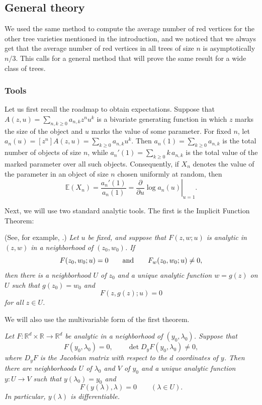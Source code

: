\documentclass[11pt, onesided]{amsart}
\theoremstyle{remark}
\begin{document}
\subsection{General theory}
\label{sec:general}

We used the same method to compute the average number of red vertices for the other tree varieties mentioned in the introduction, and we noticed that we always get that the average number of red vertices in all trees of size $n$ is asymptotically $n/3$. This calls for a general method that will prove the same result for a wide class of trees.

\subsubsection{Tools}\label{subsubsec:tools}

Let us first recall the roadmap to obtain expectations.
Suppose that
$
A(z,u)=\sum_{n,k\geq 0} a_{n,k}z^n u^k
$
is a bivariate generating function in which \(z\) marks the size of the object and \(u\) marks the value of some parameter. For fixed \(n\), let
$
a_n(u)=[z^n]A(z,u)=\sum_{k\geq 0} a_{n,k}u^k.
$
Then
$
a_n(1)=\sum_{k\geq 0}a_{n,k}
$
is the total number of objects of size \(n\), while
$
a_n'(1)=\sum_{k\geq 0}k\,a_{n,k}
$
is the total value of the marked parameter over all such objects. Consequently, if \(X_n\) denotes the value of the parameter in an object of size \(n\) chosen uniformly at random, then
\begin{equation}
\label{eq:expectations}
\mathbb E(X_n)
=
\frac{a_n'(1)}{a_n(1)}
=
\left.
\frac{\partial}{\partial u}
\log a_n(u)
\right|_{u=1}.
\end{equation}


Next, we will use two standard analytic tools. The first is the Implicit Function Theorem:

\medskip
{}
(See, for example, \cite[Appendix B.5]{FlajoletSedgewick}.)
\emph{
Let $u$ be fixed, and suppose that $F(z,w;u)$ is analytic in $(z,w)$ in a neighborhood of $(z_0,w_0)$. If
\[
F(z_0,w_0;u)=0
\qquad\hbox{and}\qquad
F_w(z_0,w_0;u)\neq 0,
\]
then there is a neighborhood $U$ of $z_0$ and a unique analytic function $w=g(z)$ on $U$ such that $g(z_0)=w_0$ and
\[
F(z,g(z);u)=0
\]
for all $z\in U$.
}
\medskip

We will also use the multivariable form of the first theorem.

\medskip
{}
\emph{
Let $F\colon \mathbb R^d\times\mathbb R\to\mathbb R^d$ be analytic in a
neighborhood of $(y_0,\lambda_0)$. Suppose that
\[
F(y_0,\lambda_0)=0,
\qquad
\det D_yF(y_0,\lambda_0)\neq0,
\]
where $D_yF$ is the Jacobian matrix with respect to the $d$ coordinates
of $y$. Then there are neighborhoods $U$ of $\lambda_0$ and $V$ of
$y_0$ and a unique analytic function $y\colon U\to V$ such that
$y(\lambda_0)=y_0$ and
\[
F(y(\lambda),\lambda)=0\qquad(\lambda\in U).
\]
In particular, $y(\lambda)$ is differentiable.
}
\medskip
\end{document}
